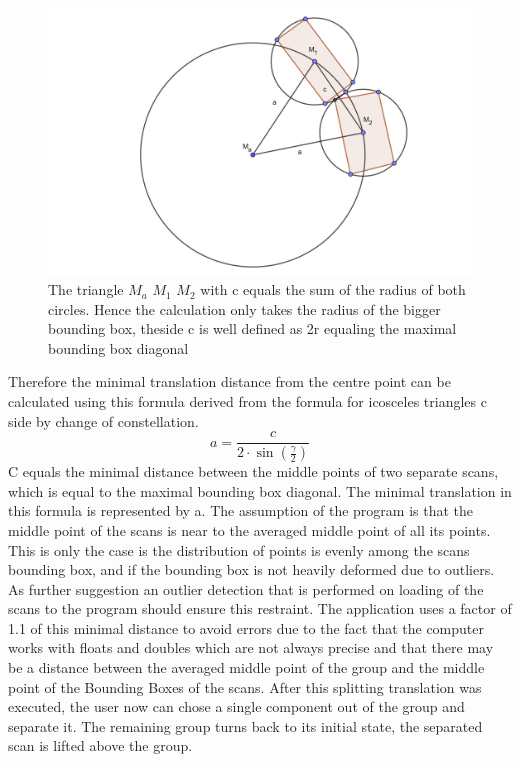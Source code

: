 \documentclass[hyperref,english,bachelorofscience,bibnum,twoside]{cgvpub}
\begin{document}
\begin{figure}[htbp]
	\centering
		\includegraphics[width= \linewidth]{ico_pic.png}
	\caption{The triangle $M_a$ $M_1$ $M_2$ with c equals the sum of the radius of both circles. Hence the calculation only takes the radius of the bigger bounding box, theside c is well defined as 2r equaling the maximal bounding box diagonal}
	\label{fig:ico}
\end{figure}

Therefore the minimal translation distance from the centre point can be calculated using this formula derived from the formula for icosceles triangles c side by change of constellation.
\[
{\displaystyle  a= {\frac {c}{2 \cdot \sin \left({\frac {\gamma }{2}}\right)}} }
\]
C equals the minimal distance between the middle points of two separate scans, which is equal to the maximal bounding box diagonal. The minimal translation in this formula is represented by a.
The assumption of the program is that the middle point of the scans is near to the averaged middle point of all its points. This is only the case is the distribution of points is evenly among the scans bounding box, and if the bounding box is not heavily deformed due to outliers.
As further suggestion an outlier detection that is performed on loading of the scans to the program should ensure this restraint.
The application uses a factor of 1.1 of this minimal distance to avoid errors due to the fact that the computer works with floats and doubles which are not always precise and that there may be a distance between the averaged middle point of the group and the middle point of the Bounding Boxes of the scans.
After this splitting translation was executed, the user now can chose a single component out of the group and separate it. The remaining group turns back to its initial state, the separated scan is lifted above the group.
\end{document}
